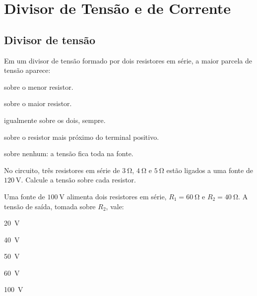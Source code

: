 
\section{Divisor de Tensão e de Corrente}

\subsection{Divisor de tensão}

\blocofixacao
\begin{questao}[1]{}

Em um divisor de tensão formado por dois resistores em série, a maior parcela de
tensão aparece:
\begin{alternativas}
\item sobre o menor resistor.
\item sobre o maior resistor.
\item igualmente sobre os dois, sempre.
\item sobre o resistor mais próximo do terminal positivo.
\item sobre nenhum: a tensão fica toda na fonte.
\end{alternativas}


\end{questao}
\begin{questao}[1]{}

No circuito, três resistores em série de $\SI{3}{\ohm}$, $\SI{4}{\ohm}$ e
$\SI{5}{\ohm}$ estão ligados a uma fonte de $\SI{120}{\volt}$. Calcule a tensão
sobre cada resistor.




\end{questao}
\begin{questao}[1]{}

Uma fonte de $\SI{100}{\volt}$ alimenta dois resistores em série,
$R_1=\SI{60}{\ohm}$ e $R_2=\SI{40}{\ohm}$. A tensão de saída, tomada sobre $R_2$,
vale:
\begin{alternativas}[3]
\item \SI{20}{\volt}
\item \SI{40}{\volt}
\item \SI{50}{\volt}
\item \SI{60}{\volt}
\item \SI{100}{\volt}
\end{alternativas}


\end{questao}
